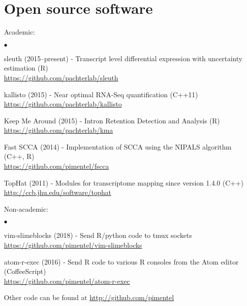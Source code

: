 \documentclass[11pt,notitlepage]{article} %
\newenvironment{list2}{
  \vspace{-\parskip}
  \begin{list}{$\bullet$}{%
      \setlength{\itemsep}{0in}
      \setlength{\parsep}{0in} \setlength{\parskip}{0in}
      \setlength{\topsep}{0in} \setlength{\partopsep}{0in}
      \setlength{\leftmargin}{0.2in}}}{\end{list}}
\begin{document}
\bigskip
\section*{Open source software}

\medskip
Academic:

\begin{list2}
  \item sleuth (2015--present) - Transcript level differential expression with uncertainty estimation (R)\\
    \url{https://github.com/pachterlab/sleuth}
  \item kallisto (2015) - Near optimal RNA-Seq quantification (C++11)\\
    \url{https://github.com/pachterlab/kallisto}
  \item Keep Me Around (2015) - Intron Retention Detection and Analysis (R) \\
    \url{https://github.com/pachterlab/kma}
  \item Fast SCCA (2014) - Implementation of SCCA using the NIPALS algorithm (C++, R) \\
    \url{https://github.com/pimentel/fscca}
  \item TopHat (2011) - Modules for transcriptome mapping since version 1.4.0 (C++) \\
    \url{http://ccb.jhu.edu/software/tophat}
\end{list2}

\bigskip
Non-academic:

\begin{list2}
\item vim-slimeblocks (2018) - Send R/python code to tmux sockets\\
  \url{https://github.com/pimentel/vim-slimeblocks}
\item atom-r-exec (2016) - Send R code to various R consoles from the Atom editor (CoffeeScript)\\
  \url{https://github.com/pimentel/atom-r-exec}
  \item Other code can be found at \url{http://github.com/pimentel}

\end{list2}

\bigskip
\end{document}
